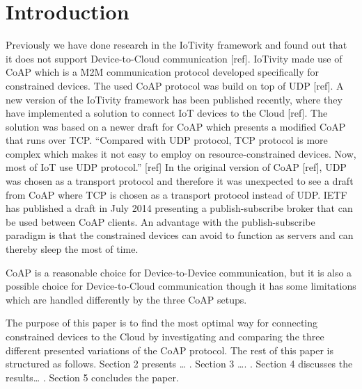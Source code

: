 \section{Introduction}
Previously we have done research in the IoTivity framework and found out that it does not support Device-to-Cloud communication [ref].
IoTivity made use of CoAP which is a M2M communication protocol developed specifically for constrained devices.
The used CoAP protocol was build on top of UDP [ref].
A new version of the IoTivity framework has been published recently, where they have implemented a solution to connect IoT devices to the Cloud [ref]. The solution was based on a newer draft for CoAP which presents a modified CoAP that runs over TCP.
“Compared with UDP protocol, TCP protocol is more complex which makes it not easy to employ on resource-constrained devices. Now, most of IoT use UDP protocol.” [ref]
In the original version of CoAP [ref], UDP was chosen as a transport protocol and therefore it was unexpected to see a draft from CoAP where TCP is chosen as a transport protocol instead of UDP.
IETF has published a draft in July 2014 presenting a publish-subscribe broker that can be used between CoAP clients. An advantage with the publish-subscribe paradigm is that the constrained devices can avoid to function as servers and can thereby sleep the most of time.

CoAP is a reasonable choice for Device-to-Device communication,  but it is also a possible choice for Device-to-Cloud communication though it has some limitations which are handled differently by the three CoAP setups.

The purpose of this paper is to find the most optimal way for connecting constrained devices to the Cloud by investigating and comparing the three different presented variations of the CoAP protocol. The rest of this paper is structured as follows.  Section 2 presents … . Section 3 …. . Section 4 discusses the results… . Section 5 concludes the paper.     
